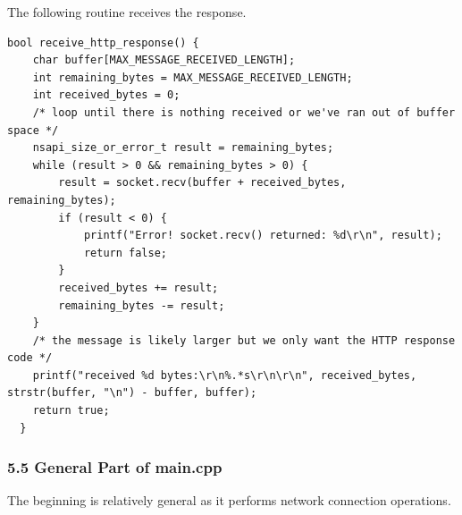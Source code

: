 \documentclass[10pt,a4paper,onecolumn]{article}
\begin{document}
The following routine receives the response.

\begin{lstlisting}[style=CStyle]
  bool receive_http_response() {
    char buffer[MAX_MESSAGE_RECEIVED_LENGTH];
    int remaining_bytes = MAX_MESSAGE_RECEIVED_LENGTH;
    int received_bytes = 0;
    /* loop until there is nothing received or we've ran out of buffer space */
    nsapi_size_or_error_t result = remaining_bytes;
    while (result > 0 && remaining_bytes > 0) {
        result = socket.recv(buffer + received_bytes, remaining_bytes);
        if (result < 0) {
            printf("Error! socket.recv() returned: %d\r\n", result);
            return false;
        }
        received_bytes += result;
        remaining_bytes -= result;
    }
    /* the message is likely larger but we only want the HTTP response code */
    printf("received %d bytes:\r\n%.*s\r\n\r\n", received_bytes, strstr(buffer, "\n") - buffer, buffer);
    return true;
  }
\end{lstlisting}

\hypertarget{general-part-of-main.cpp}{%
\subsubsection{5.5 General Part of
main.cpp}\label{general-part-of-main.cpp}}

The beginning is relatively general as it performs network connection
operations.
\end{document}
